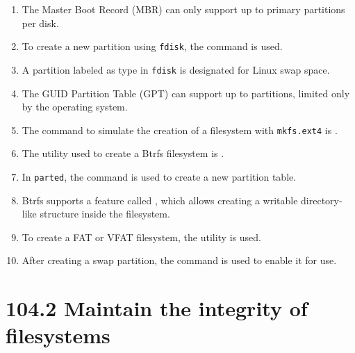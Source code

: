 \documentclass[a4paper]{report}
\begin{document}
\begin{enumerate}[1.]
\item The Master Boot Record (MBR) can only support up to \underline{\hspace{2cm}} primary partitions per disk.

\item To create a new partition using \texttt{fdisk}, the command \underline{\hspace{2cm}} is used.

\item A partition labeled as type \underline{\hspace{2cm}} in \texttt{fdisk} is designated for Linux swap space.

\item The GUID Partition Table (GPT) can support up to \underline{\hspace{2cm}} partitions, limited only by the operating system.

\item The command to simulate the creation of a filesystem with \texttt{mkfs.ext4} is \underline{\hspace{2cm}}.

\item The utility used to create a Btrfs filesystem is \underline{\hspace{2cm}}.

\item In \texttt{parted}, the command \underline{\hspace{2cm}} is used to create a new partition table.

\item Btrfs supports a feature called \underline{\hspace{2cm}}, which allows creating a writable directory-like structure inside the filesystem.

\item To create a FAT or VFAT filesystem, the utility \underline{\hspace{2cm}} is used.

\item After creating a swap partition, the command \underline{\hspace{2cm}} is used to enable it for use.
\end{enumerate}

\newpage
\section*{104.2 Maintain the integrity of filesystems}
\end{document}
